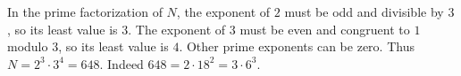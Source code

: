In the prime factorization of $N$, the exponent of $2$ must be odd and divisible by $3$, so its least value is $3$. The exponent of $3$ must be even and congruent to $1$ modulo $3$, so its least value is $4$. Other prime exponents can be zero. Thus $N=2^3\cdot3^4=\boxed{648}$. Indeed $648=2\cdot18^2=3\cdot6^3$.
